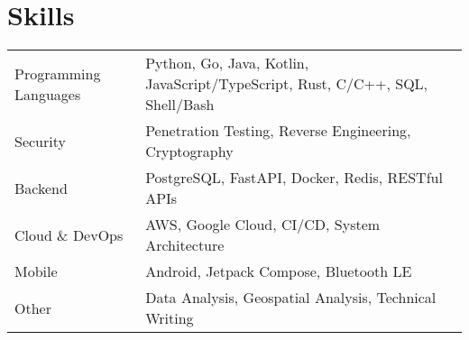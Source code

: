 \section{Skills}
\begin{tabularx}{\linewidth}{@{}l X@{}}
	Programming Languages & \normalsize{Python, Go, Java, Kotlin, JavaScript/TypeScript, Rust, C/C++, SQL, Shell/Bash} \\
	Security              & \normalsize{Penetration Testing, Reverse Engineering, Cryptography}                        \\
	Backend               & \normalsize{PostgreSQL, FastAPI, Docker, Redis, RESTful APIs}                              \\
	Cloud \& DevOps       & \normalsize{AWS, Google Cloud, CI/CD, System Architecture}                                 \\
	Mobile                & \normalsize{Android, Jetpack Compose, Bluetooth LE}                                        \\
	Other                 & \normalsize{Data Analysis, Geospatial Analysis, Technical Writing}                    \\
\end{tabularx}
